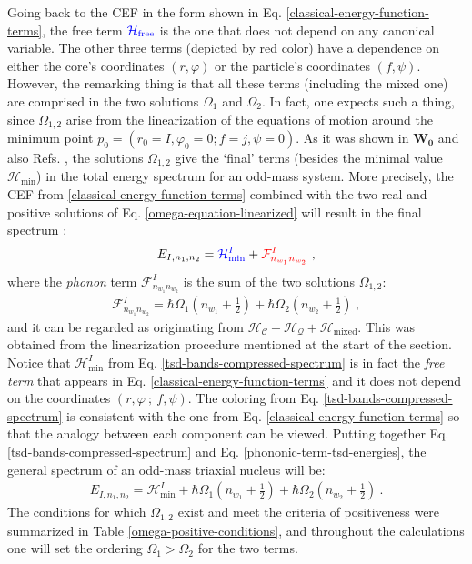 Going back to the CEF in the form shown in Eq. \ref{classical-energy-function-terms}, the free term ${\color{blue}\mathcal{H}_\text{free}}$ is the one that does not depend on any canonical variable. The other three terms (depicted by red color) have a dependence on either the core's coordinates $(r,\varphi)$ or the particle's coordinates $(f,\psi)$. However, the remarking thing is that all these terms (including the mixed one) are comprised in the two solutions $\Omega_1$ and $\Omega_2$. In fact, one expects such a thing, since $\Omega_{1,2}$ arise from the linearization of the equations of motion around the minimum point $p_0=(r_0=I,\varphi_0=0;f=j,\psi=0)$. As it was shown in $\mathbf{W_0}$ and also Refs. \cite{raduta2020approach,raduta2020new}, the solutions $\Omega_{1,2}$ give the `final' terms (besides the minimal value $\mathcal{H}_\text{min}$) in the total energy spectrum for an odd-mass system. More precisely, the CEF from \ref{classical-energy-function-terms} combined with the two real and positive solutions of Eq. \ref{omega-equation-linearized} will result in the final spectrum \cite{poenaru2021extensive1}:
\begin{align}
    E_{I,n_1,n_2}={\color{blue}\mathcal{H}_\text{min}^I}+{\color{red}\mathcal{F}^I_{n_{w_1}n_{w_2}}}\ ,
    \label{tsd-bands-compressed-spectrum}
\end{align}
where the \emph{phonon} term $\mathcal{F}_{n_{w_1}n_{w_2}}^I$ is the sum of the two solutions $\Omega_{1,2}$:
\begin{align}
    \mathcal{F}_{n_{w_1}n_{w_2}}^I=\hbar\Omega_1\left(n_{w_1}+\frac{1}{2}\right)+\hbar\Omega_2\left(n_{w_2}+\frac{1}{2}\right)\ ,
    \label{phononic-term-tsd-energies}
\end{align}
and it can be regarded as originating from $\mathcal{H}_\mathscr{C}+\mathcal{H}_\mathcal{Q}+\mathcal{H}_\text{mixed}$. This was obtained from the linearization procedure mentioned at the start of the section. Notice that $\mathcal{H}_\text{min}^I$ from Eq. \ref{tsd-bands-compressed-spectrum} is in fact the \emph{free term} that appears in Eq. \ref{classical-energy-function-terms} and it does not depend on the coordinates $(r, \varphi\ ;\ f, \psi)$. The coloring from Eq. \ref{tsd-bands-compressed-spectrum} is consistent with the one from Eq. \ref{classical-energy-function-terms} so that the analogy between each component can be viewed. Putting together Eq. \ref{tsd-bands-compressed-spectrum} and Eq. \ref{phononic-term-tsd-energies}, the general spectrum of an odd-mass triaxial nucleus will be:
\begin{align}
    E_{I,n_1,n_2}=\mathcal{H}_\text{min}^I+\hbar\Omega_1\left(n_{w_1}+\frac{1}{2}\right)+\hbar\Omega_2\left(n_{w_2}+\frac{1}{2}\right)\ .
    \label{tsd-bands-general-spectrum}
\end{align}
The conditions for which $\Omega_{1,2}$ exist and meet the criteria of positiveness were summarized in Table \ref{omega-positive-conditions}, and throughout the calculations one will set the ordering $\Omega_1>\Omega_2$ for the two terms.

